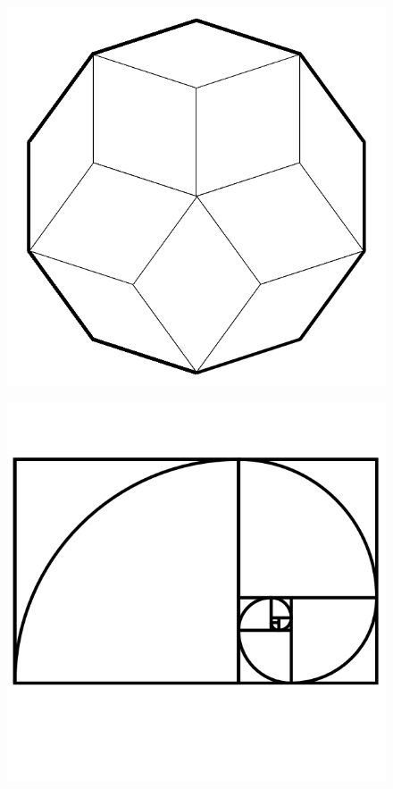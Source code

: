 \documentclass[17pt]{extreport}
\begin{document}
	\begin{figure}
		\centering
		\includegraphics[width=6.25in]{imageserver/uploadimages/image7.png}
	\end{figure}
	
	\begin{figure}
		\centering
		\includegraphics[width=6.25in]{imageserver/uploadimages/image18.png}
		
	\end{figure}
	
\end{document}
